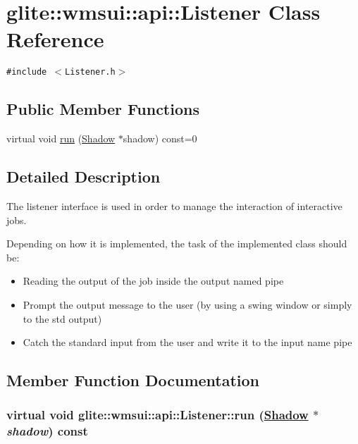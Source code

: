 \hypertarget{classglite_1_1wmsui_1_1api_1_1Listener}{
\section{glite::wmsui::api::Listener Class Reference}
\label{classglite_1_1wmsui_1_1api_1_1Listener}
}
{\tt \#include $<$Listener.h$>$}

\subsection*{Public Member Functions}
\begin{CompactItemize}
\item 
virtual void \hyperlink{classglite_1_1wmsui_1_1api_1_1Listener_a0}{run} (\hyperlink{classglite_1_1wmsui_1_1api_1_1Shadow}{Shadow} $\ast$shadow) const=0
\end{CompactItemize}


\subsection{Detailed Description}
The listener interface is used in order to manage the interaction of interactive jobs. 

Depending on how it is implemented, the task of the implemented class should be: \begin{itemize}
\item Reading the output of the job inside the output named pipe \item Prompt the output message to the user (by using a swing window or simply to the std output) \item Catch the standard input from the user and write it to the input name pipe \end{itemize}




\subsection{Member Function Documentation}
\hypertarget{classglite_1_1wmsui_1_1api_1_1Listener_a0}{
\subsubsection[run]{\setlength{\rightskip}{0pt plus 5cm}virtual void glite::wmsui::api::Listener::run (\hyperlink{classglite_1_1wmsui_1_1api_1_1Shadow}{Shadow} $\ast$ {\em shadow}) const}}
\label{classglite_1_1wmsui_1_1api_1_1Listener_a0}


